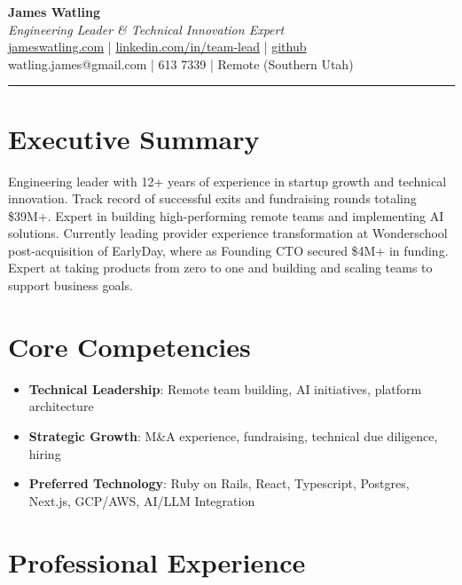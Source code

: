 \documentclass[letterpaper,10pt]{article}
\begin{document}
\begin{center}
    {\huge \textbf{James Watling}}\\[5pt]
    \textit{Engineering Leader \& Technical Innovation Expert}\\[5pt]
    \href{https://jameswatling.com}{jameswatling.com} \quad | \quad 
    \href{https://www.linkedin.com/in/team-lead/}{linkedin.com/in/team-lead} \quad | \quad 
    \href{https://github.com/JamesWatling/}{github}\\[3pt]
    watling.james@gmail.com \quad |  613 7339 \quad | \quad Remote (Southern Utah) 
\end{center}


\hrule

\section*{Executive Summary}
Engineering leader with 12+ years of experience in startup growth and technical innovation. Track record of successful exits and fundraising rounds totaling \$39M+. Expert in building high-performing remote teams and implementing AI solutions. Currently leading provider experience transformation at Wonderschool post-acquisition of EarlyDay, where as Founding CTO secured \$4M+ in funding. Expert at taking products from zero to one and building and scaling teams to support business goals.

\section*{Core Competencies}
\begin{itemize}[leftmargin=*, nosep]
    \item \textbf{Technical Leadership}: Remote team building, AI initiatives, platform architecture
    \item \textbf{Strategic Growth}: M\&A experience, fundraising, technical due diligence, hiring
    \item \textbf{Preferred Technology}: Ruby on Rails, React, Typescript, Postgres, Next.js, GCP/AWS, AI/LLM Integration
\end{itemize}

\section*{Professional Experience}
\end{document}
